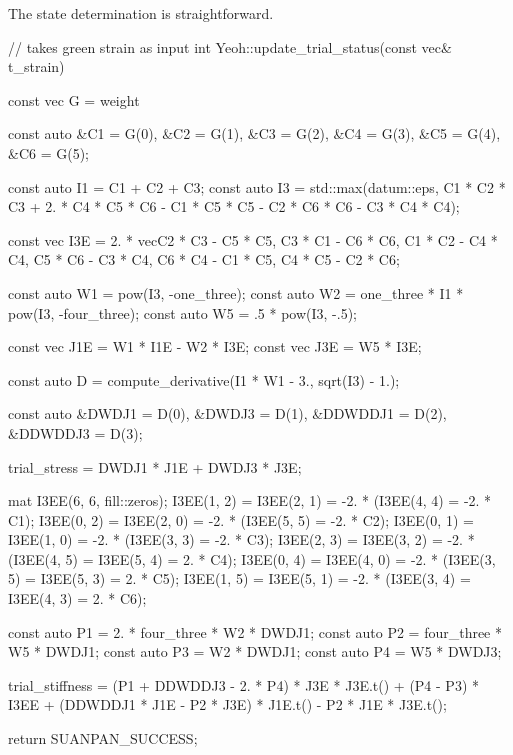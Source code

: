The state determination is straightforward.
\begin{cppcode}
// takes green strain as input
int Yeoh::update_trial_status(const vec& t_strain) {
    const vec G = weight %

    const auto &C1 = G(0), &C2 = G(1), &C3 = G(2), &C4 = G(3), &C5 = G(4), &C6 = G(5);

    const auto I1 = C1 + C2 + C3;
    const auto I3 = std::max(datum::eps, C1 * C2 * C3 + 2. * C4 * C5 * C6 - C1 * C5 * C5 - C2 * C6 * C6 - C3 * C4 * C4);

    const vec I3E = 2. * vec{C2 * C3 - C5 * C5, C3 * C1 - C6 * C6, C1 * C2 - C4 * C4, C5 * C6 - C3 * C4, C6 * C4 - C1 * C5, C4 * C5 - C2 * C6};

    const auto W1 = pow(I3, -one_three);
    const auto W2 = one_three * I1 * pow(I3, -four_three);
    const auto W5 = .5 * pow(I3, -.5);

    const vec J1E = W1 * I1E - W2 * I3E;
    const vec J3E = W5 * I3E;

    const auto D = compute_derivative(I1 * W1 - 3., sqrt(I3) - 1.);

    const auto &DWDJ1 = D(0), &DWDJ3 = D(1), &DDWDDJ1 = D(2), &DDWDDJ3 = D(3);

    trial_stress = DWDJ1 * J1E + DWDJ3 * J3E;

    mat I3EE(6, 6, fill::zeros);
    I3EE(1, 2) = I3EE(2, 1) = -2. * (I3EE(4, 4) = -2. * C1);
    I3EE(0, 2) = I3EE(2, 0) = -2. * (I3EE(5, 5) = -2. * C2);
    I3EE(0, 1) = I3EE(1, 0) = -2. * (I3EE(3, 3) = -2. * C3);
    I3EE(2, 3) = I3EE(3, 2) = -2. * (I3EE(4, 5) = I3EE(5, 4) = 2. * C4);
    I3EE(0, 4) = I3EE(4, 0) = -2. * (I3EE(3, 5) = I3EE(5, 3) = 2. * C5);
    I3EE(1, 5) = I3EE(5, 1) = -2. * (I3EE(3, 4) = I3EE(4, 3) = 2. * C6);

    const auto P1 = 2. * four_three * W2 * DWDJ1;
    const auto P2 = four_three * W5 * DWDJ1;
    const auto P3 = W2 * DWDJ1;
    const auto P4 = W5 * DWDJ3;

    trial_stiffness = (P1 + DDWDDJ3 - 2. * P4) * J3E * J3E.t() + (P4 - P3) * I3EE + (DDWDDJ1 * J1E - P2 * J3E) * J1E.t() - P2 * J1E * J3E.t();

    return SUANPAN_SUCCESS;
}
\end{cppcode}
